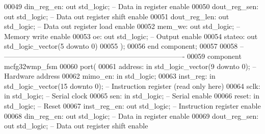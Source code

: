 \begin{DoxyCode}
00049         din_reg_en: \textcolor{keywordflow}{out} \textcolor{comment}{std\_logic};          \textcolor{keyword}{-- Data in register enable}
00050         dout_reg_sen: \textcolor{keywordflow}{out} \textcolor{comment}{std\_logic};            \textcolor{keyword}{-- Data out register shift enable}
00051         dout_reg_len: \textcolor{keywordflow}{out} \textcolor{comment}{std\_logic};            \textcolor{keyword}{-- Data out register load enable}
00052         mem_we: \textcolor{keywordflow}{out} \textcolor{comment}{std\_logic};              \textcolor{keyword}{-- Memory write enable}
00053         oe: \textcolor{keywordflow}{out} \textcolor{comment}{std\_logic};              \textcolor{keyword}{-- Output enable}
00054         stateo: \textcolor{keywordflow}{out} \textcolor{comment}{std\_logic\_vector}(\textcolor{vhdllogic}{}\textcolor{vhdllogic}{5} \textcolor{keywordflow}{downto} \textcolor{vhdllogic}{}\textcolor{vhdllogic}{0})
00055     );
00056 \textcolor{keywordflow}{end} \textcolor{keywordflow}{component};
00057 
00058 \textcolor{keyword}{-- ----------------------------------------------------------------------------}
00059 \textcolor{keywordflow}{component} mcfg32wmp\_fsm
00060     \textcolor{keywordflow}{port}(
00061         address: \textcolor{keywordflow}{in} \textcolor{comment}{std\_logic\_vector}(\textcolor{vhdllogic}{}\textcolor{vhdllogic}{9} \textcolor{keywordflow}{downto} \textcolor{vhdllogic}{}\textcolor{vhdllogic}{0});   \textcolor{keyword}{-- Hardware address}
00062         mimo\_en: \textcolor{keywordflow}{in} \textcolor{comment}{std\_logic};
00063         inst\_reg: \textcolor{keywordflow}{in} \textcolor{comment}{std\_logic\_vector}(\textcolor{vhdllogic}{}\textcolor{vhdllogic}{15} \textcolor{keywordflow}{downto} \textcolor{vhdllogic}{}\textcolor{vhdllogic}{0}); \textcolor{keyword}{-- Instruction register (read only here)}
00064         sclk: \textcolor{keywordflow}{in} \textcolor{comment}{std\_logic};             \textcolor{keyword}{-- Serial clock}
00065         sen: \textcolor{keywordflow}{in} \textcolor{comment}{std\_logic};              \textcolor{keyword}{-- Serial enable}
00066         reset: \textcolor{keywordflow}{in} \textcolor{comment}{std\_logic};                \textcolor{keyword}{-- Reset}
00067         inst\_reg\_en: \textcolor{keywordflow}{out} \textcolor{comment}{std\_logic};         \textcolor{keyword}{-- Instruction register enable}
00068         din\_reg\_en: \textcolor{keywordflow}{out} \textcolor{comment}{std\_logic};          \textcolor{keyword}{-- Data in register enable}
00069         dout\_reg\_sen: \textcolor{keywordflow}{out} \textcolor{comment}{std\_logic};            \textcolor{keyword}{-- Data out register shift enable}

\end{DoxyCode}
